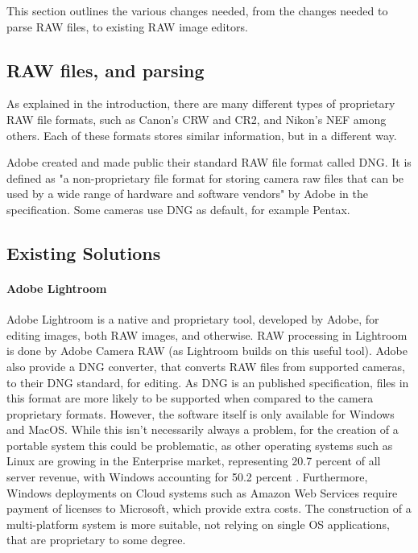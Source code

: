 \documentclass[10pt,a4paper]{article}
\begin{document}
This section outlines the various changes needed, from the changes needed to parse RAW files, to existing RAW image editors.

\subsection{RAW files, and parsing}
% 
As explained in the introduction, there are many different types of proprietary RAW file formats, such as Canon's CRW and CR2, and Nikon's NEF among others.
Each of these formats stores similar information, but in a different way.

Adobe created and made public their standard RAW file format called DNG. It is defined as "a non-proprietary file format for storing camera raw files that
can be used by a wide range of hardware and software vendors" by Adobe in the specification. \cite{DNGSpec} Some cameras use DNG as default, for example
Pentax.

\subsection{Existing Solutions}

    \paragraph{Adobe Lightroom}
    Adobe Lightroom is a native and proprietary tool, developed by Adobe, for editing images, both RAW images, and otherwise.
    RAW processing in Lightroom is done by Adobe Camera RAW (as Lightroom builds on this useful tool). \cite{AdobeCameraRAW}
    Adobe also provide a DNG converter, that converts RAW files from supported cameras, to their DNG standard,
    for editing. As DNG is an published specification, files in this format are more likely to be supported
    when compared to the camera proprietary formats. However, the software itself is only available for Windows
    and MacOS.\cite{AdobeDNGConverter} While this isn't necessarily always a problem, for the creation of a portable system this could be problematic,
    as other operating systems such as Linux are growing in the Enterprise market, representing 20.7 percent of all server revenue, with Windows
    accounting for 50.2 percent \cite{LinuxServerGrowth}. Furthermore, Windows deployments on Cloud systems such as Amazon Web Services require
    payment of licenses to Microsoft, which provide extra costs. The construction of a multi-platform system is more suitable, not relying on
    single OS applications, that are proprietary to some degree.
\end{document}
